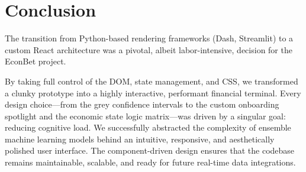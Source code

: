 \documentclass[12pt]{article}
\begin{document}
\section{Conclusion}

The transition from Python-based rendering frameworks (Dash, Streamlit) to a custom React architecture was a pivotal, albeit labor-intensive, decision for the EconBet project. 

By taking full control of the DOM, state management, and CSS, we transformed a clunky prototype into a highly interactive, performant financial terminal. Every design choice—from the grey confidence intervals to the custom onboarding spotlight and the economic state logic matrix—was driven by a singular goal: reducing cognitive load. We successfully abstracted the complexity of ensemble machine learning models behind an intuitive, responsive, and aesthetically polished user interface. The component-driven design ensures that the codebase remains maintainable, scalable, and ready for future real-time data integrations.
\end{document}
